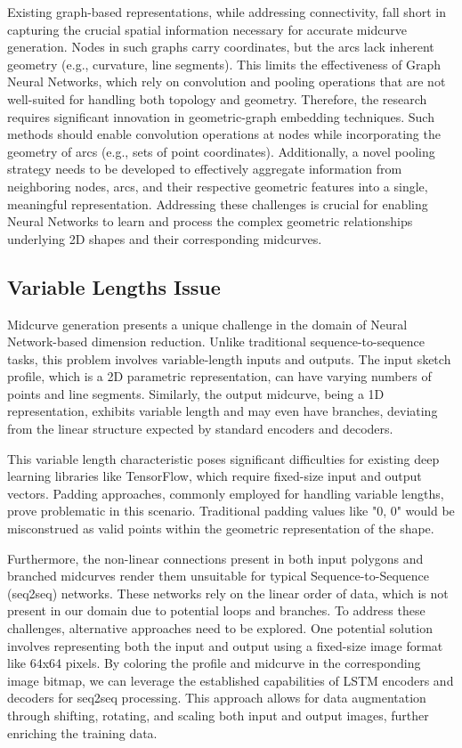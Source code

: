 \documentclass[10pt, conference]{IEEEtran}
\begin{document}
Existing graph-based representations, while addressing connectivity, fall short in capturing the crucial spatial information necessary for accurate midcurve generation. Nodes in such graphs carry coordinates, but the arcs lack inherent geometry (e.g., curvature, line segments). This limits the effectiveness of Graph Neural Networks, which rely on convolution and pooling operations that are not well-suited for handling both topology and geometry.
Therefore, the research requires significant innovation in geometric-graph embedding techniques. Such methods should enable convolution operations at nodes while incorporating the geometry of arcs (e.g., sets of point coordinates). Additionally, a novel pooling strategy needs to be developed to effectively aggregate information from neighboring nodes, arcs, and their respective geometric features into a single, meaningful representation. Addressing these challenges is crucial for enabling Neural Networks to learn and process the complex geometric relationships underlying 2D shapes and their corresponding midcurves.

\subsection{Variable Lengths Issue}
\label{subsec:5}

Midcurve generation presents a unique challenge in the domain of Neural Network-based dimension reduction. Unlike traditional sequence-to-sequence tasks, this problem involves variable-length inputs and outputs. The input sketch profile, which is a 2D parametric representation, can have varying numbers of points and line segments. Similarly, the output midcurve, being a 1D representation, exhibits variable length and may even have branches, deviating from the linear structure expected by standard encoders and decoders.


This variable length characteristic poses significant difficulties for existing deep learning libraries like TensorFlow, which require fixed-size input and output vectors. Padding approaches, commonly employed for handling variable lengths, prove problematic in this scenario. Traditional padding values like "0, 0" would be misconstrued as valid points within the geometric representation of the shape.


Furthermore, the non-linear connections present in both input polygons and branched midcurves render them unsuitable for typical Sequence-to-Sequence (seq2seq) networks. These networks rely on the linear order of data, which is not present in our domain due to potential loops and branches.
To address these challenges, alternative approaches need to be explored. One potential solution involves representing both the input and output using a fixed-size image format like 64x64 pixels. By coloring the profile and midcurve in the corresponding image bitmap, we can leverage the established capabilities of LSTM encoders and decoders for seq2seq processing. This approach allows for data augmentation through shifting, rotating, and scaling both input and output images, further enriching the training data.
\end{document}
